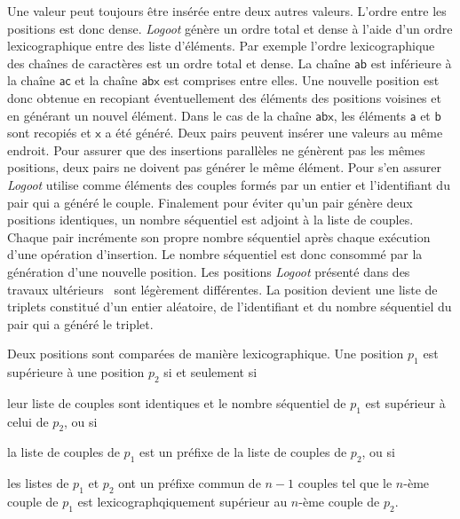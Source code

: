 Une valeur peut toujours être insérée entre deux autres valeurs.
L'ordre entre les positions est donc dense.
\emph{Logoot} génère un ordre total et dense à l'aide d'un ordre lexicographique entre des liste d'éléments.
Par exemple l'ordre lexicographique des chaînes de caractères est un ordre total et dense.
La chaîne $\textsf{ab}$ est inférieure à la chaîne $\textsf{ac}$ et la chaîne $\textsf{abx}$ est comprises entre elles.
Une nouvelle position est donc obtenue en recopiant éventuellement des éléments des positions voisines et en générant un nouvel élément.
Dans le cas de la chaîne $\textsf{abx}$, les éléments $\textsf{a}$ et $\textsf{b}$ sont recopiés et $\textsf{x}$ a été généré.
Deux pairs peuvent insérer une valeurs au même endroit.
Pour assurer que des insertions parallèles ne génèrent pas les mêmes positions, deux pairs ne doivent pas générer le même élément.
Pour s'en assurer \emph{Logoot} utilise comme éléments des couples formés par un entier et l'identifiant du pair qui a généré le couple.
Finalement pour éviter qu'un pair génère deux positions identiques, un nombre séquentiel est adjoint à la liste de couples.
Chaque pair incrémente son propre nombre séquentiel après chaque exécution d'une opération d'insertion.
Le nombre séquentiel est donc consommé par la génération d'une nouvelle position.
Les positions \emph{Logoot} présenté dans des travaux ultérieurs~\autocite{weiss2010logoot} sont légèrement différentes.
La position devient une liste de triplets constitué d'un entier aléatoire, de l'identifiant et du nombre séquentiel du pair qui a généré le triplet.

Deux positions sont comparées de manière lexicographique.
Une position $p_1$ est supérieure à une position $p_2$ si et seulement si \begin{inlinelist}\item leur liste de couples sont identiques et le nombre séquentiel de $p_1$ est supérieur à celui de $p_2$, ou si \item la liste de couples de $p_1$ est un préfixe de la liste de couples de $p_2$, ou si \item les listes de $p_1$ et $p_2$ ont un préfixe commun de $n-1$ couples tel que le $n$-ème couple de $p_1$ est lexicographqiquement supérieur au $n$-ème couple de $p_2$.\end{inlinelist}

